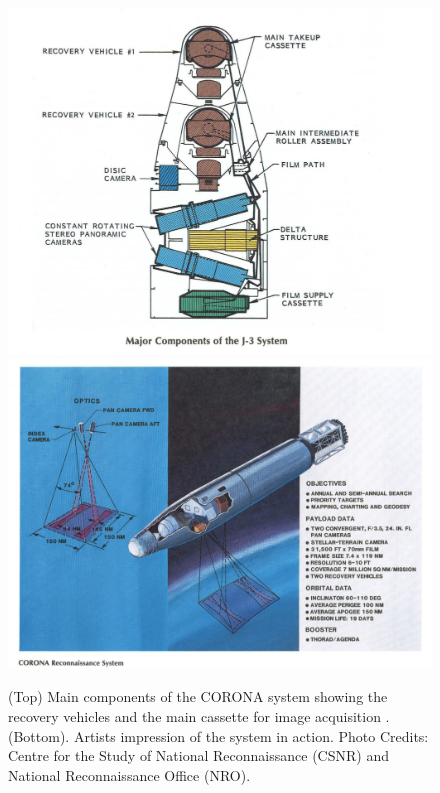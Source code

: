

\begin{figure}[H]
\centering
\includegraphics[totalheight=0.33\textheight]{j-3_system.png}
\includegraphics[totalheight=0.3\textheight]{CORONA REC .png}
\caption{(Top) Main components of the CORONA system showing the recovery vehicles and the main cassette for image acquisition . (Bottom). Artists impression of the system in action. Photo Credits: Centre for the Study of National Reconnaissance (CSNR) and National Reconnaissance Office (NRO). \cite{CORONA}
}
\end{figure}

